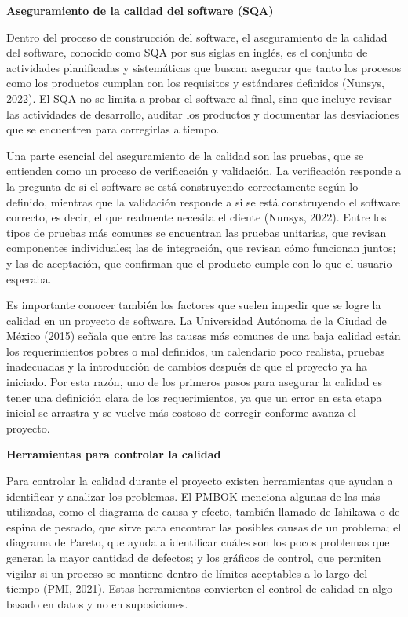 \documentclass[12pt,letterpaper]{article}
\newcommand{\subtitulo}[1]{\vspace{12pt}\noindent\textbf{#1}\par\vspace{10pt}}
\begin{document}
\subtitulo{Aseguramiento de la calidad del software (SQA)}
Dentro del proceso de construcción del software, el aseguramiento de la calidad del software, conocido como SQA por sus siglas en inglés, es el conjunto de actividades planificadas y sistemáticas que buscan asegurar que tanto los procesos como los productos cumplan con los requisitos y estándares definidos (Nunsys, 2022). El SQA no se limita a probar el software al final, sino que incluye revisar las actividades de desarrollo, auditar los productos y documentar las desviaciones que se encuentren para corregirlas a tiempo.

Una parte esencial del aseguramiento de la calidad son las pruebas, que se entienden como un proceso de verificación y validación. La verificación responde a la pregunta de si el software se está construyendo correctamente según lo definido, mientras que la validación responde a si se está construyendo el software correcto, es decir, el que realmente necesita el cliente (Nunsys, 2022). Entre los tipos de pruebas más comunes se encuentran las pruebas unitarias, que revisan componentes individuales; las de integración, que revisan cómo funcionan juntos; y las de aceptación, que confirman que el producto cumple con lo que el usuario esperaba.

Es importante conocer también los factores que suelen impedir que se logre la calidad en un proyecto de software. La Universidad Autónoma de la Ciudad de México (2015) señala que entre las causas más comunes de una baja calidad están los requerimientos pobres o mal definidos, un calendario poco realista, pruebas inadecuadas y la introducción de cambios después de que el proyecto ya ha iniciado. Por esta razón, uno de los primeros pasos para asegurar la calidad es tener una definición clara de los requerimientos, ya que un error en esta etapa inicial se arrastra y se vuelve más costoso de corregir conforme avanza el proyecto.

\subtitulo{Herramientas para controlar la calidad}
Para controlar la calidad durante el proyecto existen herramientas que ayudan a identificar y analizar los problemas. El PMBOK menciona algunas de las más utilizadas, como el diagrama de causa y efecto, también llamado de Ishikawa o de espina de pescado, que sirve para encontrar las posibles causas de un problema; el diagrama de Pareto, que ayuda a identificar cuáles son los pocos problemas que generan la mayor cantidad de defectos; y los gráficos de control, que permiten vigilar si un proceso se mantiene dentro de límites aceptables a lo largo del tiempo (PMI, 2021). Estas herramientas convierten el control de calidad en algo basado en datos y no en suposiciones.
\end{document}
